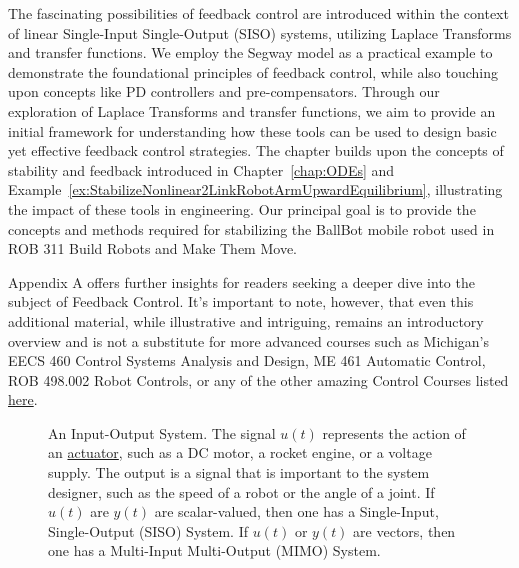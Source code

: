 The fascinating possibilities of feedback control are introduced within the context of linear Single-Input Single-Output (SISO) systems, utilizing Laplace Transforms and transfer functions. We employ the Segway model as a practical example to demonstrate the foundational principles of feedback control, while also touching upon concepts like PD controllers and pre-compensators. Through our exploration of Laplace Transforms and transfer functions, we aim to provide an initial framework for understanding how these tools can be used to design basic yet effective feedback control strategies. The chapter builds upon the concepts of stability and feedback introduced in Chapter~\ref{chap:ODEs} and Example~\ref{ex:StabilizeNonlinear2LinkRobotArmUpwardEquilibrium}, illustrating the impact of these tools in engineering. Our principal goal is to provide the concepts and methods required for stabilizing the BallBot mobile robot used in ROB 311 Build Robots and Make Them Move. 

Appendix A offers further insights for readers seeking a deeper dive into the subject of Feedback Control. It's important to note, however, that even this additional material, while illustrative and intriguing, remains an introductory overview and is not a substitute for more advanced courses such as Michigan's EECS 460 Control Systems Analysis and Design, ME 461 Automatic Control, ROB 498.002 Robot Controls, or any of the other amazing Control Courses listed \href{https://controls.engin.umich.edu/control-courses/}{here}.  \\



\begin{figure}[hbt]
\centering
{}
    \caption[An Input-Output System]{An Input-Output System. The signal \(u(t)\) represents the action of an \href{https://en.wikipedia.org/wiki/Actuator}{actuator}, such as a DC motor, a rocket engine, or a voltage supply. The output is a signal that is important to the system designer, such as the speed of a robot or the angle of a joint. If $u(t)$ are $y(t)$ are scalar-valued, then one has a Single-Input, Single-Output (SISO) System. If $u(t)$ or $y(t)$ are vectors, then one has a Multi-Input Multi-Output (MIMO) System.}
    \label{fig:SISOsystemDiagram}
\end{figure}


